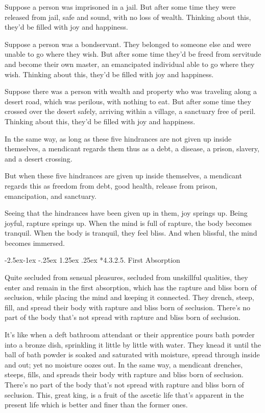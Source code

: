 \documentclass[12pt,openany]{book}%
\makeatletter
\renewcommand\paragraph{\@startsection{paragraph}{4}{\z@}%
            {-2.5ex\@plus -1ex \@minus -.25ex}%
            {1.25ex \@plus .25ex}%
            {\noindent\Semiboldnormalfont\normalsize}}
\makeatother
\begin{document}
Suppose a person was imprisoned in a jail. But after some time they were released from jail, safe and sound, with no loss of wealth. Thinking about this, they’d be filled with joy and happiness. 

Suppose a person was a bondservant. They belonged to someone else and were unable to go where they wish. But after some time they’d be freed from servitude and become their own master, an emancipated individual able to go where they wish. Thinking about this, they’d be filled with joy and happiness. 

Suppose there was a person with wealth and property who was traveling along a desert road, which was perilous, with nothing to eat. But after some time they crossed over the desert safely, arriving within a village, a sanctuary free of peril. Thinking about this, they’d be filled with joy and happiness. 

In the same way, as long as these five hindrances are not given up inside themselves, a mendicant regards them thus as a debt, a disease, a prison, slavery, and a desert crossing. 

But when these five hindrances are given up inside themselves, a mendicant regards this as freedom from debt, good health, release from prison, emancipation, and sanctuary. 

Seeing that the hindrances have been given up in them, joy springs up. Being joyful, rapture springs up. When the mind is full of rapture, the body becomes tranquil. When the body is tranquil, they feel bliss. And when blissful, the mind becomes immersed. 

\paragraph*{4.3.2.5. First Absorption }

Quite secluded from sensual pleasures, secluded from unskillful qualities, they enter and remain in the first absorption, which has the rapture and bliss born of seclusion, while placing the mind and keeping it connected. They drench, steep, fill, and spread their body with rapture and bliss born of seclusion. There’s no part of the body that’s not spread with rapture and bliss born of seclusion. 

It’s like when a deft bathroom attendant or their apprentice pours bath powder into a bronze dish, sprinkling it little by little with water. They knead it until the ball of bath powder is soaked and saturated with moisture, spread through inside and out; yet no moisture oozes out. In the same way, a mendicant drenches, steeps, fills, and spreads their body with rapture and bliss born of seclusion. There’s no part of the body that’s not spread with rapture and bliss born of seclusion. This, great king, is a fruit of the ascetic life that’s apparent in the present life which is better and finer than the former ones. 
\end{document}
